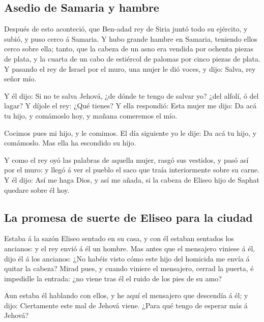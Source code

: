 \hypertarget{asedio-de-samaria-y-hambre}{%
\subsection{Asedio de Samaria y
hambre}\label{asedio-de-samaria-y-hambre}}

 Después de esto aconteció, que Ben-adad rey de Siria
juntó todo su ejército, y subió, y puso cerco á Samaria. 
Y hubo grande hambre en Samaria, teniendo ellos cerco sobre ella; tanto,
que la cabeza de un asno era vendida por ochenta piezas de plata, y la
cuarta de un cabo de estiércol de palomas por cinco piezas de plata.
 Y pasando el rey de Israel por el muro, una mujer le dió
voces, y dijo: Salva, rey señor mío.

 Y él dijo: Si no te salva Jehová, ¿de dónde te tengo de
salvar yo? ¿del alfolí, ó del lagar?  Y díjole el rey:
¿Qué tienes? Y ella respondió: Esta mujer me dijo: Da acá tu hijo, y
comámoslo hoy, y mañana comeremos el mío.

 Cocimos pues mi hijo, y le comimos. El día siguiente yo
le dije: Da acá tu hijo, y comámoslo. Mas ella ha escondido su hijo.

 Y como el rey oyó las palabras de aquella mujer, rasgó
sus vestidos, y pasó así por el muro: y llegó á ver el pueblo el saco
que traía interiormente sobre su carne.  Y él dijo: Así
me haga Dios, y así me añada, si la cabeza de Eliseo hijo de Saphat
quedare sobre él hoy.

\hypertarget{la-promesa-de-suerte-de-eliseo-para-la-ciudad}{%
\subsection{La promesa de suerte de Eliseo para la
ciudad}\label{la-promesa-de-suerte-de-eliseo-para-la-ciudad}}

 Estaba á la sazón Eliseo sentado en su casa, y con él
estaban sentados los ancianos: y el rey envió á él un hombre. Mas antes
que el mensajero viniese á él, dijo él á los ancianos: ¿No habéis visto
cómo este hijo del homicida me envía á quitar la cabeza? Mirad pues, y
cuando viniere el mensajero, cerrad la puerta, é impedidle la entrada:
¿no viene tras él el ruido de los pies de su amo?

 Aun estaba él hablando con ellos, y he aquí el mensajero
que descendía á él; y dijo: Ciertamente este mal de Jehová viene. ¿Para
qué tengo de esperar más á Jehová?

